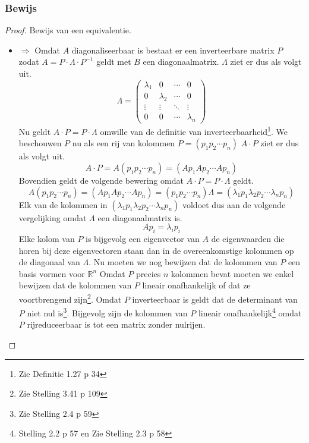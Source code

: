 \documentclass[lineaire_algebra_oplossingen.tex]{subfiles}
\begin{document}
\subsubsection*{Bewijs}
\begin{proof}
Bewijs van een equivalentie.
\begin{itemize}
\item $\Rightarrow$
Omdat $A$ diagonaliseerbaar is bestaat er een inverteerbare matrix $P$ zodat $A = P \cdot \Lambda\cdot P^{-1}$ geldt met $B$ een diagonaalmatrix. $\Lambda$ ziet er dus als volgt uit.
\[
\Lambda =
\begin{pmatrix}
\lambda_1 & 0 & \cdots & 0\\
0 & \lambda_2 & \cdots & 0\\
\vdots & \vdots & \ddots & \vdots\\
0 & 0 & \cdots & \lambda_n
\end{pmatrix}
\]
Nu geldt $A \cdot P = P \cdot \Lambda$ omwille van de definitie van inverteerbaarheid\footnote{Zie Definitie 1.27 p 34}.
We beschouwen $P$ nu als een rij van kolommen $P=(p_1 p_2 \cdots p_n)$
$A\cdot P$ ziet er dus als volgt uit.
\[
A\cdot P = A(p_1 p_2 \cdots p_n) = (Ap_1 Ap_2 \cdots Ap_n)
\]
Bovendien geldt de volgende bewering omdat $A \cdot P = P \cdot \Lambda$ geldt.
\[
A(p_1 p_2 \cdots p_n) = (Ap_1 Ap_2 \cdots Ap_n) = (p_1 p_2 \cdots p_n)\Lambda = (\lambda_1p_1 \lambda_2p_2 \cdots \lambda_np_n)
\]
Elk van de kolommen in $(\lambda_1p_1 \lambda_2p_2 \cdots \lambda_np_n)$ voldoet dus aan de volgende vergelijking omdat $\Lambda$ een diagonaalmatrix is.
\[
Ap_i = \lambda_ip_i
\]
Elke kolom van $P$ is bijgevolg een eigenvector van $A$ de eigenwaarden die horen bij deze eigenvectoren staan dan in de overeenkomstige kolommen op de diagonaal van $\Lambda$.
Nu moeten we nog bewijzen dat de kolommen van $P$ een basis vormen voor $\mathbb{R}^n$
Omdat $P$ precies $n$ kolommen bevat moeten we enkel bewijzen dat de kolommen van $P$ lineair onafhankelijk of dat ze voortbrengend zijn\footnote{Zie Stelling 3.41 p 109}. Omdat $P$ inverteerbaar is geldt dat de determinant van $P$ niet nul is\footnote{Zie Stelling 2.4 p 59}. Bijgevolg zijn de kolommen van $P$ lineair onafhankelijk\footnote{Stelling 2.2 p 57 en Zie Stelling 2.3 p 58} omdat $P$ rijreduceerbaar is tot een matrix zonder nulrijen.


\end{itemize}
\end{proof}
\end{document}
